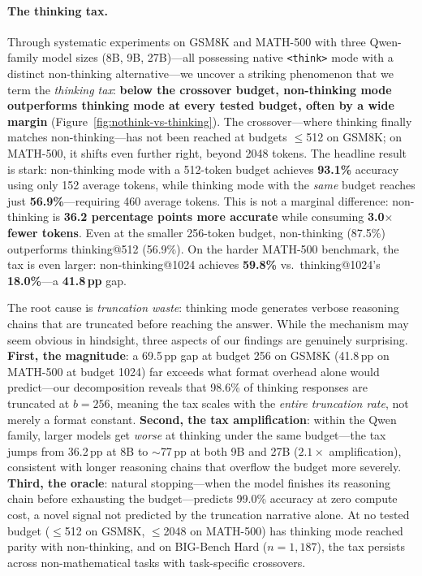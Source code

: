 \paragraph{The thinking tax.}
Through systematic experiments on GSM8K and MATH-500 with three Qwen-family model sizes (8B, 9B, 27B)---all possessing native \texttt{<think>} mode with a distinct non-thinking alternative---we uncover a striking phenomenon that we term the \emph{thinking tax}: \textbf{below the crossover budget, non-thinking mode outperforms thinking mode at every tested budget, often by a wide margin} (Figure~\ref{fig:nothink-vs-thinking}).
The crossover---where thinking finally matches non-thinking---has not been reached at budgets $\leq$512 on GSM8K; on MATH-500, it shifts even further right, beyond 2048 tokens.
The headline result is stark: non-thinking mode with a 512-token budget achieves \textbf{93.1\%} accuracy using only 152 average tokens, while thinking mode with the \emph{same} budget reaches just \textbf{56.9\%}---requiring 460 average tokens.
This is not a marginal difference: non-thinking is \textbf{36.2 percentage points more accurate} while consuming \textbf{3.0$\times$ fewer tokens}.
Even at the smaller 256-token budget, non-thinking (87.5\%) outperforms thinking@512 (56.9\%).
On the harder MATH-500 benchmark, the tax is even larger: non-thinking@1024 achieves \textbf{59.8\%} vs.\ thinking@1024's \textbf{18.0\%}---a \textbf{41.8\,pp} gap.

The root cause is \emph{truncation waste}: thinking mode generates verbose reasoning chains that are truncated before reaching the answer.
While the mechanism may seem obvious in hindsight, three aspects of our findings are genuinely surprising.
\textbf{First, the magnitude}: a 69.5\,pp gap at budget 256 on GSM8K (41.8\,pp on MATH-500 at budget 1024) far exceeds what format overhead alone would predict---our decomposition reveals that 98.6\% of thinking responses are truncated at $b{=}256$, meaning the tax scales with the \emph{entire truncation rate}, not merely a format constant.
\textbf{Second, the tax amplification}: within the Qwen family, larger models get \emph{worse} at thinking under the same budget---the tax jumps from 36.2\,pp at 8B to ${\sim}$77\,pp at both 9B and 27B ($2.1\times$ amplification), consistent with longer reasoning chains that overflow the budget more severely.
\textbf{Third, the oracle}: natural stopping---when the model finishes its reasoning chain before exhausting the budget---predicts 99.0\% accuracy at zero compute cost, a novel signal not predicted by the truncation narrative alone.
At no tested budget ($\leq$512 on GSM8K, $\leq$2048 on MATH-500) has thinking mode reached parity with non-thinking, and on BIG-Bench Hard ($n{=}1{,}187$), the tax persists across non-mathematical tasks with task-specific crossovers.

